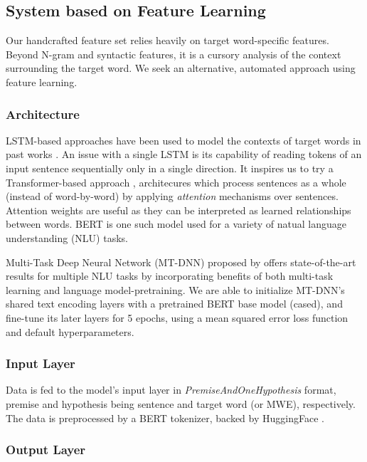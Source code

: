 \documentclass[11pt,a4paper]{article}
\begin{document}
\subsection{System based on Feature Learning}

Our handcrafted feature set relies heavily on target word-specific features. Beyond N-gram and syntactic features, it is a cursory analysis of the context surrounding the target word. We seek an alternative, automated approach using feature learning.

\subsubsection{Architecture}

LSTM-based approaches have been used to model the contexts of target words in past works \citep{hartmanndossantos2018nilc, dehertogtack2018deep}. An issue with a single LSTM is its capability of reading tokens of an input sentence sequentially only in a single direction. It inspires us to try a Transformer-based approach \citep{DBLP:journals/corr/VaswaniSPUJGKP17}, architecures which process sentences as a whole (instead of word-by-word) by applying \textit{attention} mechanisms over sentences. Attention weights are useful as they can be interpreted as learned relationships between words. BERT \citep{DBLP:journals/corr/abs-1810-04805} is one such model used for a variety of natual language understanding (NLU) tasks.

Multi-Task Deep Neural Network (MT-DNN) proposed by \citet{liuetal2019multitask} offers state-of-the-art results for multiple NLU tasks by incorporating benefits of both multi-task learning and language model-pretraining. We are able to initialize MT-DNN's shared text encoding layers with a pretrained BERT base model (cased), and fine-tune its later layers for 5 epochs, using a mean squared error loss function and default hyperparameters.

\subsubsection{Input Layer}

Data is fed to the model's input layer in \textit{PremiseAndOneHypothesis} format, premise and hypothesis being sentence and target word (or MWE), respectively. The data is preprocessed by a BERT tokenizer, backed by HuggingFace \citep{wolf_etal_2020_transformers}.

\subsubsection{Output Layer}
\end{document}

